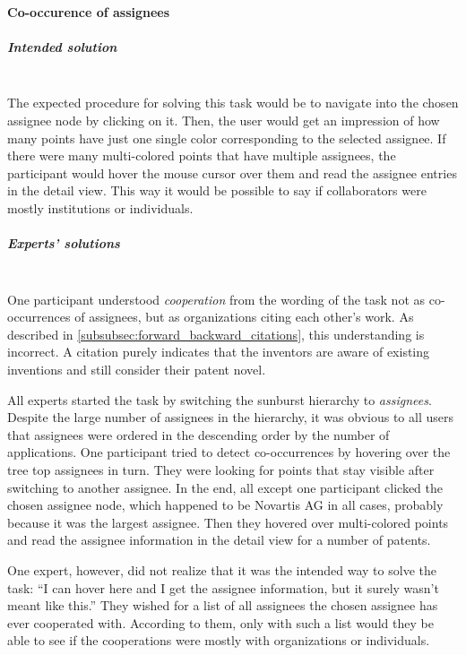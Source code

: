 \paragraph{Co-occurence of assignees}
\subparagraph{Intended solution}~\\
The expected procedure for solving this task would be to navigate into the chosen assignee node by clicking on it.
Then, the user would get an impression of how many points have just one single color corresponding to the selected assignee. 
If there were many multi-colored points that have multiple assignees, the participant would hover the mouse cursor over them and read the assignee entries in the detail view.
This way it would be possible to say if collaborators were mostly institutions or individuals.

\subparagraph{Experts' solutions}~\\
One participant understood \textit{cooperation} from the wording of the task not as co-occurrences of assignees, but as organizations citing each other's work.
As described in \autoref{subsubsec:forward_backward_citations}, this understanding is incorrect.
A citation purely indicates that the inventors are aware of existing inventions and still consider their patent novel.

All experts started the task by switching the sunburst hierarchy to \textit{assignees}. 
Despite the large number of assignees in the hierarchy, it was obvious to all users that assignees were ordered in the descending order by the number of applications.
One participant tried to detect co-occurrences by hovering over the tree top assignees in turn.
They were looking for points that stay visible after switching to another assignee.
In the end, all except one participant clicked the chosen assignee node, which happened to be Novartis AG in all cases, probably because it was the largest assignee. 
Then they hovered over multi-colored points and read the assignee information in the detail view for a number of patents.

One expert, however, did not realize that it was the intended way to solve the task: ``I can hover here and I get the assignee information, but it surely wasn't meant like this.''
They wished for a list of all assignees the chosen assignee has ever cooperated with.
According to them, only with such a list would they be able to see if the cooperations were mostly with organizations or individuals.

